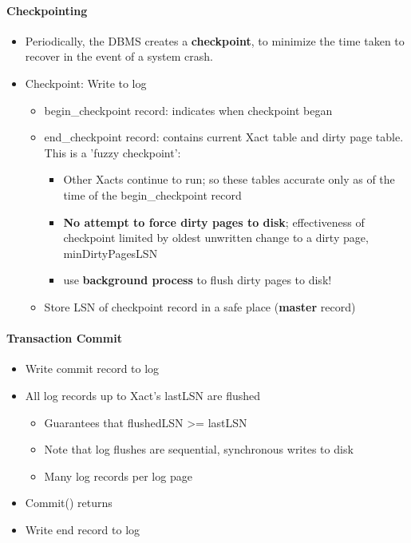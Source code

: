 \paragraph{Checkpointing}
\begin{itemize}
\item Periodically, the DBMS creates a \textbf{checkpoint}, to minimize
  the time taken to recover in the event of a system crash.
\item Checkpoint: Write to log
  \begin{itemize}
  \item begin\_checkpoint record: indicates when checkpoint began
  \item end\_checkpoint record: contains current Xact table and
    dirty page table. \\
    This is a 'fuzzy checkpoint':
    \begin{itemize}
    \item Other Xacts continue to run; so these tables accurate only
      as of the time of the begin\_checkpoint record
    \item \textbf{No attempt to force dirty pages to disk};
      effectiveness of checkpoint limited by oldest unwritten change to
      a dirty page, {\color{red} minDirtyPagesLSN}
    \item use \textbf{background process} to flush dirty pages
      to disk!
    \end{itemize}

  \item Store LSN of checkpoint record in a safe place
    (\textbf{master} record)
  \end{itemize}
\end{itemize}

\paragraph{Transaction Commit}
\begin{itemize}
\item Write commit record to log
\item All log records up to Xact's lastLSN are flushed
  \begin{itemize}
  \item Guarantees that flushedLSN >= lastLSN
  \item Note that log flushes are sequential, synchronous
    writes to disk
  \item Many log records per log page
  \end{itemize}

\item Commit() returns
\item Write end record to log
\end{itemize}


